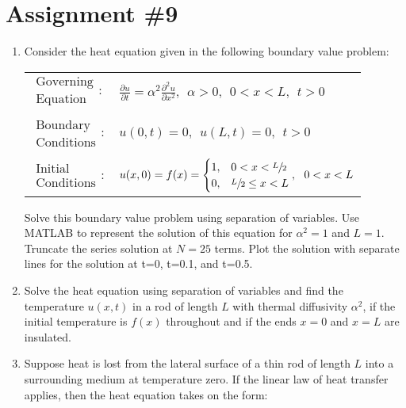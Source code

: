 \chapter{Assignment \#9}
\label{ch:ass9}
\begin{fullwidth}


\begin{enumerate}
\item Consider the heat equation given in the following boundary value problem:
\begin{table}[h]
\begin{tabular}{l l}
$\substack{\text{Governing} \\\text{Equation}}: $& $\frac{\partial u}{\partial t} = \alpha^2 \frac{\partial^2 u}{\partial x^2}, \ \ \alpha>0, \ \ 0<x<L, \ \ t>0$ \\
& \\
$\substack{\text{Boundary} \\ \text{Conditions}}: $& $u(0,t)=0, \ \ u(L,t) = 0, \ \ t>0$\\
& \\
$\substack{\text{Initial} \\ \text{Conditions}}: $ & $u(x,0) = f(x) = 
\begin{cases}
1, & 0 < x < \sfrac{L}{2} \\
0, & \sfrac{L}{2} \le x < L 
\end{cases}, \ \ 0<x<L $ \\
\end{tabular}
\end{table}

Solve this boundary value problem using separation of variables.  Use MATLAB to represent the solution of this equation for $\alpha^2 = 1$ and $L=1$.  Truncate the series solution at $N=25$ terms.  Plot the solution with separate lines for the solution at t=0, t=0.1, and t=0.5. 


\vspace{2.0cm}

\item Solve the heat equation using separation of variables and find the temperature $u(x,t)$ in a rod of length $L$ with thermal diffusivity $\alpha^2$, if the initial temperature is $f(x)$ throughout and if the ends $x=0$ and $x=L$ are insulated.


\vspace{2.0cm}

\item Suppose heat is lost from the lateral surface of a thin rod of length $L$ into a surrounding medium at temperature zero.  If the linear law of heat transfer applies, then the heat equation takes on the form:


\end{enumerate}
\end{fullwidth}
